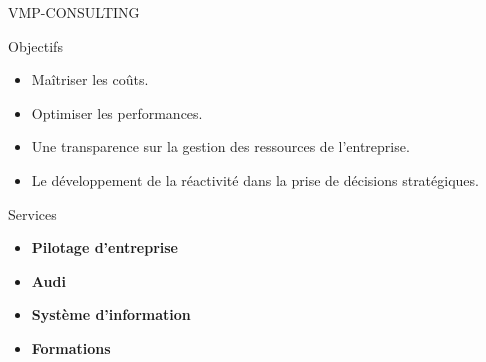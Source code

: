 \documentclass[french]{beamer}
\begin{document}
\begin{frame}{VMP-CONSULTING}



\begin{block}{Objectifs}
\begin{itemize}

\item Maîtriser les coûts.

\item Optimiser les performances.

\item Une transparence sur la gestion des ressources de  l'entreprise.

\item Le développement de la réactivité dans la prise de décisions stratégiques.
\end{itemize}

\end{block}

\begin{block}{Services}
\begin{itemize}

\item \textbf{Pilotage d'entreprise } 


\item \textbf{Audi }


\item \textbf{Système d'information } 

\item \textbf{Formations }
\end{itemize}

\end{block}



	
\end{frame}
\end{document}
